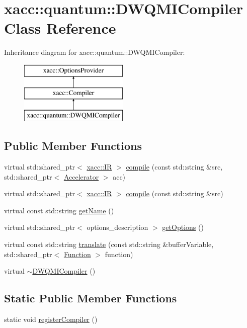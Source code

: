 \hypertarget{a01137}{}\section{xacc\+:\+:quantum\+:\+:D\+W\+Q\+M\+I\+Compiler Class Reference}
\label{a01137}
Inheritance diagram for xacc\+:\+:quantum\+:\+:D\+W\+Q\+M\+I\+Compiler\+:\begin{figure}[H]
\begin{center}
\leavevmode
\includegraphics[height=3.000000cm]{a01137}
\end{center}
\end{figure}
\subsection*{Public Member Functions}
\begin{DoxyCompactItemize}
\item 
virtual std\+::shared\+\_\+ptr$<$ \hyperlink{a01677}{xacc\+::\+IR} $>$ \hyperlink{a01137_a0df05642f1a6fd44ce7f1c0396d50c9c}{compile} (const std\+::string \&src, std\+::shared\+\_\+ptr$<$ \hyperlink{a01613}{Accelerator} $>$ acc)
\item 
virtual std\+::shared\+\_\+ptr$<$ \hyperlink{a01677}{xacc\+::\+IR} $>$ \hyperlink{a01137_aa22591343b5509bf2c3a5820130ba906}{compile} (const std\+::string \&src)
\item 
virtual const std\+::string \hyperlink{a01137_aed42de96f8e0dd94b6de183f28aee419}{get\+Name} ()
\item 
virtual std\+::shared\+\_\+ptr$<$ options\+\_\+description $>$ \hyperlink{a01137_a0851334cc33b5b1da2694150a0a1a43c}{get\+Options} ()
\item 
virtual const std\+::string \hyperlink{a01137_a56a345539665099329209b3b5f6810c9}{translate} (const std\+::string \&buffer\+Variable, std\+::shared\+\_\+ptr$<$ \hyperlink{a01653}{Function} $>$ function)
\item 
virtual \hyperlink{a01137_a86f9135f7dc1c3246970e2a7f6540b5c}{$\sim$\+D\+W\+Q\+M\+I\+Compiler} ()
\end{DoxyCompactItemize}
\subsection*{Static Public Member Functions}
\begin{DoxyCompactItemize}
\item 
static void \hyperlink{a01137_a421daa5286f31e2b5ab4c141a34c94cd}{register\+Compiler} ()
\end{DoxyCompactItemize}
